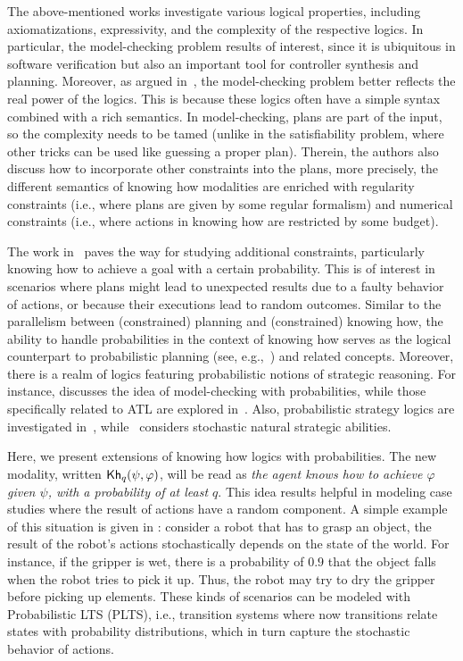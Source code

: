The above-mentioned works investigate various logical properties, including axiomatizations, expressivity, and the complexity of the respective logics. In particular, the model-checking problem results of interest, since it is  ubiquitous in software verification but also an important tool for controller synthesis and planning. Moreover, as argued in~\cite{DF23}, the model-checking problem better reflects the real power of the logics. This is because these logics often have a simple syntax combined with a rich semantics. In model-checking, plans are part of the input, so the complexity needs to be tamed (unlike in the satisfiability problem, where other tricks can be used like guessing a proper plan). Therein,  the authors also discuss how to incorporate other constraints into the plans, more precisely, the different semantics of knowing how modalities are enriched with regularity constraints (i.e., where plans are given by some regular formalism) and numerical constraints (i.e., where actions in knowing how are restricted by some budget). 

The work in~\cite{DF23} paves the way for studying additional constraints, particularly knowing how to achieve a goal with a certain probability. This is of interest in scenarios where plans might lead to unexpected results due to a faulty behavior of actions,  or because their executions lead to random outcomes. Similar to the parallelism between (constrained) planning and (constrained) knowing how, the ability to handle probabilities in the context of knowing how serves as the logical counterpart to probabilistic planning (see, e.g.,~\cite{MadaniHC99}) and related concepts. Moreover, there is a realm of logics featuring probabilistic notions of strategic reasoning. For instance, \cite{BaierAFK18} discusses the idea of model-checking with probabilities, while those specifically related to ATL are explored in~\cite{BA95,TJ07,BullingJ09}. Also, probabilistic strategy logics are investigated in~\cite{AKMM19}, while~\cite{BerthonKMM24} considers stochastic natural strategic abilities. %

Here, we present extensions of knowing how logics with probabilities. The new modality, written ${\mathsf{Kh}}_q(\psi,\varphi)$, will be read as \emph{the agent knows how to achieve $\varphi$ given $\psi$, with a probability of at least $q$}. This idea results helpful in modeling case studies where the result of actions have a random component. A simple example of this situation is given in \cite{Kushmerick1995}: consider a robot that has to grasp an object,  the result of the robot's actions stochastically depends on the state of the world. For instance,  if the gripper is wet,  there is  a probability of $0.9$ that the object falls when the robot tries to pick it up.  Thus,  the robot may try to dry the gripper before picking up elements.   These kinds of scenarios can be modeled with Probabilistic LTS (PLTS), i.e., transition systems where now transitions relate states with probability distributions,  which in turn  capture the stochastic behavior of actions.

